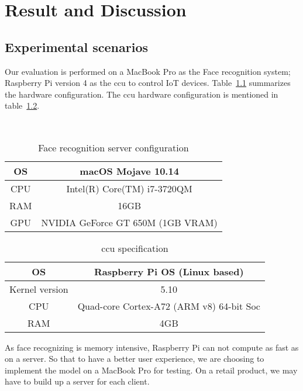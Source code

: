 \chapter{Result and Discussion}
\label{Result and Discussion}
\section{Experimental scenarios}
Our evaluation is performed on a MacBook Pro as the Face recognition system; Raspberry Pi version 4 as the \acrlong{ccu} to control IoT devices. Table~\ref{tab:serverSpecs} summarizes the hardware configuration. The \acrlong{ccu} hardware configuration is mentioned in table~\ref{tab:raspiSpecsr}.

\begin{table}[H]
    \centering
    \caption{Face recognition server configuration}
    ~\\
    \begin{tabular}{|c|c|}
        \hline
        OS & macOS Mojave 10.14 \\
        \hline
        CPU & Intel(R) Core(TM) i7-3720QM \\
        \hline
        RAM & 16GB\\
        \hline
        GPU & NVIDIA GeForce GT 650M (1GB VRAM)\\
        \hline
    \end{tabular}
    \label{tab:serverSpecs}
\end{table}

\begin{table}[H]
    \centering
    \caption{\acrlong{ccu} specification}
    \begin{tabular}{|c|c|}
        \hline
        OS & Raspberry Pi OS (Linux based) \\
        \hline
        Kernel version & 5.10\\
        \hline
        CPU & Quad-core Cortex-A72 (ARM v8) 64-bit Soc \\
        \hline
        RAM & 4GB\\
        \hline
    \end{tabular}
    \label{tab:raspiSpecsr}
\end{table}

As face recognizing is memory intensive, Raspberry Pi can not compute as fast as on a server. So that to have a better user experience, we are choosing to implement the model on a MacBook Pro for testing. On a retail product, we may have to build up a server for each client.

